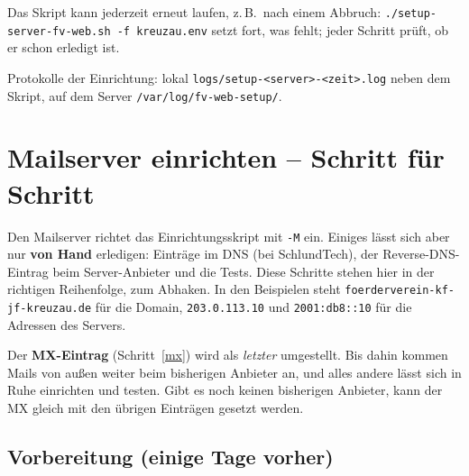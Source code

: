 \documentclass[a4paper,fontsize=10pt]{scrartcl}
\newcommand*{\cmd}[1]{\texttt{#1}}
\newcommand*{\pfad}[1]{\texttt{#1}}
\begin{document}
Das Skript kann jederzeit erneut laufen, z.\,B.\ nach einem Abbruch:
\cmd{./setup-server-fv-web.sh -f kreuzau.env} setzt fort, was fehlt; jeder Schritt
prüft, ob er schon erledigt ist.

Protokolle der Einrichtung: lokal \pfad{logs/setup-<server>-<zeit>.log} neben dem
Skript, auf dem Server \pfad{/var/log/fv-web-setup/}.

\section{Mailserver einrichten -- Schritt für Schritt}\label{sec:mail}

Den Mailserver richtet das Einrichtungsskript mit \cmd{-M} ein. Einiges lässt sich
aber nur \textbf{von Hand} erledigen: Einträge im DNS (bei SchlundTech), der
Reverse-DNS-Eintrag beim Server-Anbieter und die Tests. Diese Schritte stehen hier
in der richtigen Reihenfolge, zum Abhaken. In den Beispielen steht
\cmd{foerderverein-kf-jf-kreuzau.de} für die Domain, \cmd{203.0.113.10} und
\cmd{2001:db8::10} für die Adressen des Servers.

\begin{dshinweis}[title={Reihenfolge ist wichtig}]
Der \textbf{MX-Eintrag} (Schritt~\ref{mx}) wird als \emph{letzter} umgestellt. Bis dahin
kommen Mails von außen weiter beim bisherigen Anbieter an, und alles andere lässt sich
in Ruhe einrichten und testen. Gibt es noch keinen bisherigen Anbieter, kann der MX
gleich mit den übrigen Einträgen gesetzt werden.
\end{dshinweis}

\subsection{Vorbereitung (einige Tage vorher)}
\end{document}
